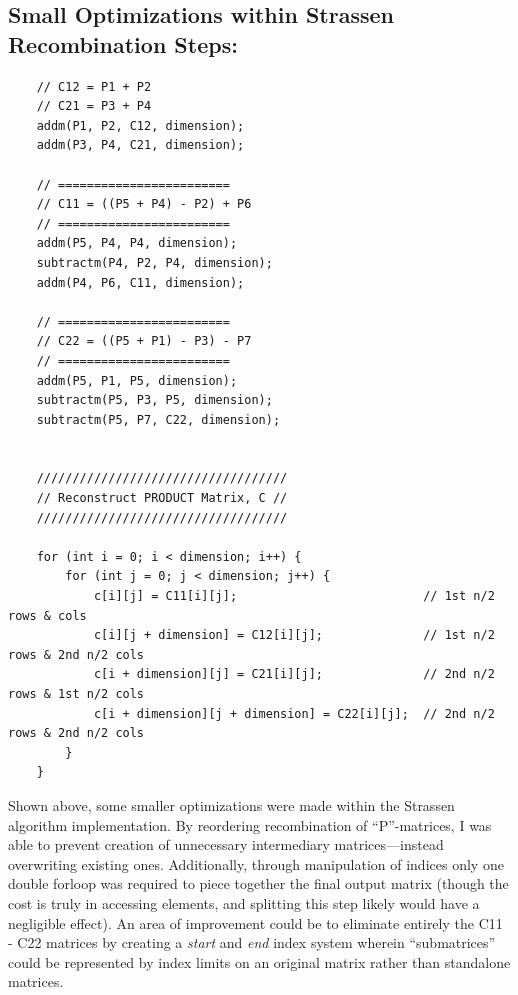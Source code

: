 \documentclass[conference]{styles/acmsiggraph}
\newcommand{\?}{\stackrel{?}{=}}
\begin{document}
\subsection{Small Optimizations within Strassen Recombination Steps:}
\begin{verbatim}
    // C12 = P1 + P2
    // C21 = P3 + P4
    addm(P1, P2, C12, dimension);
    addm(P3, P4, C21, dimension);

    // ========================
    // C11 = ((P5 + P4) - P2) + P6
    // ========================
    addm(P5, P4, P4, dimension);
    subtractm(P4, P2, P4, dimension);
    addm(P4, P6, C11, dimension);

    // ========================
    // C22 = ((P5 + P1) - P3) - P7
    // ========================
    addm(P5, P1, P5, dimension);
    subtractm(P5, P3, P5, dimension);
    subtractm(P5, P7, C22, dimension);


    ///////////////////////////////////
    // Reconstruct PRODUCT Matrix, C //
    ///////////////////////////////////

    for (int i = 0; i < dimension; i++) {
        for (int j = 0; j < dimension; j++) {
            c[i][j] = C11[i][j];                          // 1st n/2 rows & cols
            c[i][j + dimension] = C12[i][j];              // 1st n/2 rows & 2nd n/2 cols
            c[i + dimension][j] = C21[i][j];              // 2nd n/2 rows & 1st n/2 cols
            c[i + dimension][j + dimension] = C22[i][j];  // 2nd n/2 rows & 2nd n/2 cols
        }
    }
\end{verbatim}

Shown above, some smaller optimizations were made within the Strassen algorithm implementation.  By reordering recombination of \enquote{P}-matrices, I was able to prevent creation of unnecessary intermediary matrices---instead overwriting existing ones.  Additionally, through manipulation of indices only one double forloop was required to piece together the final output matrix (though the cost is truly in accessing elements, and splitting this step likely would have a negligible effect).  An area of improvement could be to eliminate entirely the C11 - C22 matrices by creating a \textit{start} and \textit{end} index system wherein \enquote{submatrices} could be represented by index limits on an original matrix rather than standalone matrices.
\end{document}
